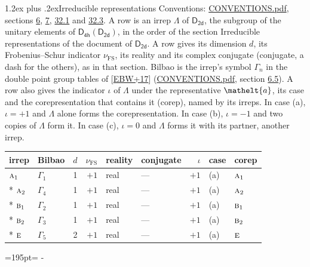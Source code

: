 \documentclass[10pt,a4paper]{article}
\makeatletter
\renewcommand\section{\@startsection{section}{1}{\z@}{-3ex plus -1ex minus -.2ex}%
  {1.2ex plus .2ex}{\normalfont\large\sffamily\bfseries\color{parttitle}}}
\newcommand{\needspace}[1]{\par\penalty-100\begingroup\dimen0=#1\relax\dimen2=\pagegoal
  \advance\dimen2-\pagetotal\ifdim\dimen0>\dimen2\relax\ifdim\dimen2>0pt\vfil\break\fi\fi
  \endgroup}
\numberwithin{equation}{section}
\newcommand{\eltfont}[1]{{\let\sigma\eltsigma\mathelt{#1}}}
\newcommand{\grp}[1]{\mathsf{#1}}
\newcommand{\irr}[1]{\text{\normalfont\scshape #1}}
\newcommand{\elt}[1]{\eltfont{#1}}
\newcommand{\fsind}{\nu_{\mathrm{FS}}}
\makeatother
\begin{document}
\section{Irreducible representations}\label{s:irreps}
Conventions: \href{../../CONVENTIONS.pdf}{CONVENTIONS.pdf}, sections \href{../../../rotation/CONVENTIONS.pdf\#conv.6}{6}, \href{../../../rotation/CONVENTIONS.pdf\#conv.7}{7}, \href{../../CONVENTIONS.pdf\#conv.32.1}{32.1} and \href{../../CONVENTIONS.pdf\#conv.32.3}{32.3}.
\leavevmode\label{n:irrep.Delta}A row is an irrep $\Lambda$ of $\grp{D_{2d}}$, the subgroup of the unitary elements of $\grp{D_{4h}}(\grp{D_{2d}})$, in the order of the section Irreducible representations of the document of \href{../../../rotation/data/pdf/D2d.pdf}{$\grp{D_{2d}}$}. \label{n:index.dimension}\label{n:index.frobenius}\label{n:head.irrep}\label{n:head.reality}\label{n:head.conjugate}A row gives its dimension $d$, its Frobenius--Schur indicator $\fsind$, its reality and its complex conjugate (conjugate, a dash for the others), as in that section. \label{n:head.bilbao}\label{n:irrep.alias.gamma}Bilbao is the irrep's symbol $\Gamma_n$ in the double point group tables of [\href{../../../REFERENCES.pdf\#ref.EBW+17}{EBW+17}] (\href{../../CONVENTIONS.pdf}{CONVENTIONS.pdf}, section \href{../../../rotation/CONVENTIONS.pdf\#conv.6.5}{6.5}). \label{n:head.case.corep}\label{n:head.corep}A row also gives the indicator $\iota$ of $\Lambda$ under the representative $\elt{a}$, its case and the corepresentation that contains it (corep), named by its irreps. In case (a), $\iota = +1$ and $\Lambda$ alone forms the corepresentation. In case (b), $\iota = -1$ and two copies of $\Lambda$ form it. In case (c), $\iota = 0$ and $\Lambda$ forms it with its partner, another irrep.
\setlength{\emergencystretch}{2em}\par\setlength{\emergencystretch}{0pt}
{\small\renewcommand{\arraystretch}{1.25}\setlength{\tabcolsep}{4pt}\begin{longtable}{@{}llrrllrll@{}}\toprule
irrep & Bilbao & $d$ & $\fsind$ & reality & conjugate & $\iota$ & case & corep\\\midrule\endhead
\bottomrule\endfoot\endlastfoot
$\irr{a}_{1}$ & $\Gamma_{1}$ & 1 & $+1$ & real & --- & $+1$ & (a) & $\irr{a}_{1}$\\*
$\irr{a}_{2}$ & $\Gamma_{4}$ & 1 & $+1$ & real & --- & $+1$ & (a) & $\irr{a}_{2}$\\*
$\irr{b}_{1}$ & $\Gamma_{2}$ & 1 & $+1$ & real & --- & $+1$ & (a) & $\irr{b}_{1}$\\*
$\irr{b}_{2}$ & $\Gamma_{3}$ & 1 & $+1$ & real & --- & $+1$ & (a) & $\irr{b}_{2}$\\*
$\irr{e}$ & $\Gamma_{5}$ & 2 & $+1$ & real & --- & $+1$ & (a) & $\irr{e}$\\
\bottomrule\end{longtable}}
\needspace{195pt}
\end{document}
